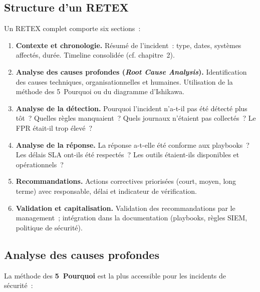 \subsection{Structure d'un RETEX}

Un RETEX complet comporte six sections~:

\begin{enumerate}
  \item \textbf{Contexte et chronologie.}
        Résumé de l'incident~: type, dates, systèmes affectés, durée.
        Timeline consolidée (cf. chapitre~2).
  \item \textbf{Analyse des causes profondes (\textit{Root Cause Analysis}).}
        Identification des causes techniques, organisationnelles et
        humaines. Utilisation de la méthode des \og{}5~Pourquoi\fg{} ou
        du diagramme d'Ishikawa.
  \item \textbf{Analyse de la détection.}
        Pourquoi l'incident n'a-t-il pas été détecté plus tôt~?
        Quelles règles manquaient~? Quels journaux n'étaient pas collectés~?
        Le FPR était-il trop élevé~?
  \item \textbf{Analyse de la réponse.}
        La réponse a-t-elle été conforme aux playbooks~?
        Les délais SLA ont-ils été respectés~?
        Les outils étaient-ils disponibles et opérationnels~?
  \item \textbf{Recommandations.}
        Actions correctives priorisées (court, moyen, long terme)
        avec responsable, délai et indicateur de vérification.
  \item \textbf{Validation et capitalisation.}
        Validation des recommandations par le management~;
        intégration dans la documentation (playbooks, règles SIEM,
        politique de sécurité).
\end{enumerate}

\subsection{Analyse des causes profondes}

La méthode des \textbf{5~Pourquoi} est la plus accessible pour les
incidents de sécurité~:

